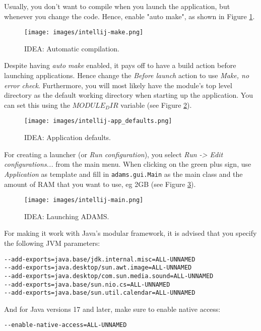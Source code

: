 Usually, you don't want to compile when you launch the application, but
whenever you change the code. Hence, enable "auto make", as shown in
Figure \ref{intellij-make}.
\begin{figure}[htb]
  \centering
  \texttt{[image: images/intellij-make.png]}
  \caption{IDEA: Automatic compilation.}
  \label{intellij-make}
\end{figure}

Despite having \textit{auto make} enabled, it pays off to have a build
action before launching applications. Hence change the \textit{Before launch}
action to use \textit{Make, no error check}. Furthermore, you will most
likely have the module's top level directory as the default working directory
when starting up the application. You can set this using the
\texttt{$MODULE_DIR$} variable (see Figure \ref{intellij-app_defaults}).
\begin{figure}[htb]
  \centering
  \texttt{[image: images/intellij-app\_defaults.png]}
  \caption{IDEA: Application defaults.}
  \label{intellij-app_defaults}
\end{figure}

For creating a launcher (or \textit{Run configuration}), you select
\textit{Run -> Edit configurations...} from the main menu. When clicking on
the green plus sign, use \textit{Application} as template and fill in
\texttt{adams.gui.Main} as the main class and the amount of RAM that you want
to use, eg 2GB (see Figure \ref{intellij-main}).
\begin{figure}[htb]
  \centering
  \texttt{[image: images/intellij-main.png]}
  \caption{IDEA: Launching ADAMS.}
  \label{intellij-main}
\end{figure}

For making it work with Java's modular framework, it is advised that you specify
the following JVM parameters:

\begin{verbatim}
--add-exports=java.base/jdk.internal.misc=ALL-UNNAMED
--add-exports=java.desktop/sun.awt.image=ALL-UNNAMED
--add-exports=java.desktop/com.sun.media.sound=ALL-UNNAMED
--add-exports=java.base/sun.nio.cs=ALL-UNNAMED
--add-exports=java.base/sun.util.calendar=ALL-UNNAMED
\end{verbatim}
And for Java versions 17 and later, make sure to enable native access:
\begin{verbatim}
--enable-native-access=ALL-UNNAMED
\end{verbatim}

